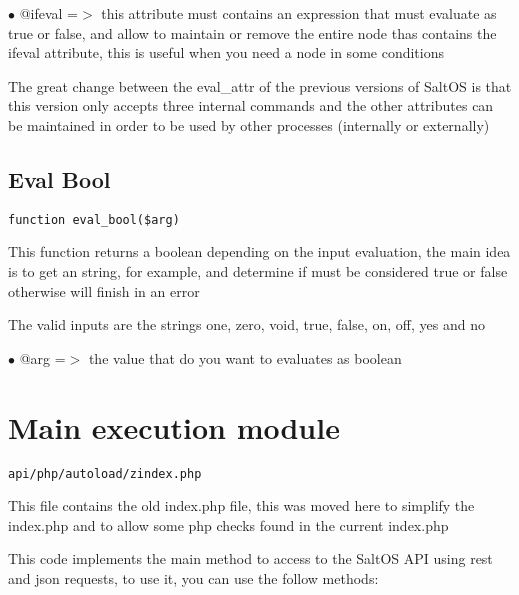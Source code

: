 \documentclass[a4paper]{book}
\begin{document}
\begin{compactitem}
\item[\color{myblue}$\bullet$] @ifeval =$>$ this attribute must contains an expression that must evaluate as
true or false, and allow to maintain or remove the entire node thas contains
the ifeval attribute, this is useful when you need a node in some conditions
\end{compactitem}

The great change between the eval\_attr of the previous versions of SaltOS is
that this version only accepts three internal commands and the other
attributes can be maintained in order to be used by other processes
(internally or externally)

\hypertarget{toc303}{}
\subsection{Eval Bool}

\begin{lstlisting}
function eval_bool($arg)
\end{lstlisting}

This function returns a boolean depending on the input evaluation, the main idea
is to get an string, for example, and determine if must be considered true or false
otherwise will finish in an error

The valid inputs are the strings one, zero, void, true, false, on, off, yes and no

\begin{compactitem}
\item[\color{myblue}$\bullet$] @arg =$>$ the value that do you want to evaluates as boolean
\end{compactitem}

\hypertarget{toc304}{}
\section{Main execution module}

\begin{lstlisting}
api/php/autoload/zindex.php
\end{lstlisting}

This file contains the old index.php file, this was moved here to simplify the index.php and to
allow some php checks found in the current index.php

This code implements the main method to access to the SaltOS API using rest and json requests, to
use it, you can use the follow methods:
\end{document}
